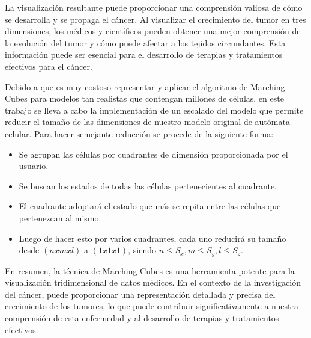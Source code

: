 La visualización resultante puede proporcionar una comprensión valiosa de cómo se desarrolla y se propaga el cáncer. Al visualizar el crecimiento del tumor en tres dimensiones, los médicos y científicos pueden obtener una mejor comprensión de la evolución del tumor y cómo puede afectar a los tejidos circundantes. Esta información puede ser esencial para el desarrollo de terapias y tratamientos efectivos para el cáncer.

Debido a que es muy costoso representar y aplicar el algoritmo de Marching Cubes para modelos tan realistas que contengan millones de c\'elulas, en este trabajo se lleva a cabo la implementaci\'on de un escalado del modelo que permite reducir el tama\~no de las dimensiones de nuestro modelo original de aut\'omata celular. Para hacer semejante reducci\'on se procede de la siguiente forma:
\begin{itemize}
    \item Se agrupan las c\'elulas por cuadrantes de dimensi\'on proporcionada por el usuario.
    \item Se buscan los estados de todas las c\'elulas pertenecientes al cuadrante.
    \item El cuadrante adoptar\'a el estado que m\'as se repita entre las c\'elulas que pertenezcan al mismo.
    \item Luego de hacer esto por varios cuadrantes, cada uno reducir\'a su tama\~no desde $(n x m x l)$ a $(1 x 1 x 1)$, siendo $n \leq S_{x} ,m \leq S_{y},l \leq S_{z}$. 
\end{itemize}

En resumen, la técnica de Marching Cubes es una herramienta potente para la visualización tridimensional de datos médicos. En el contexto de la investigación del cáncer, puede proporcionar una representación detallada y precisa del crecimiento de los tumores, lo que puede contribuir significativamente a nuestra comprensión de esta enfermedad y al desarrollo de terapias y tratamientos efectivos.\\